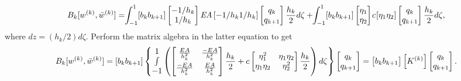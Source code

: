 \documentclass{AeroStructure-ERJohnson}
\begin{document}
\begin{align}\label{eq17.25}
B_{k}[w^{(k)}, \bar{w}^{(k)}]=\hspace*{-3pt}\int_{-1}^{1}\hspace*{-2pt}\left[b_{k} b_{k+1}\right]\left[\begin{array}{@{}c@{}}-1/h_{k} \\1/ h_{k}\end{array}\right] \textit{EA}\left[-1/h_{k} 1/h_{k}\right]\left[\begin{array}{@{}c@{}}q_{k} \\q_{k+1}\end{array}\right] \frac{h_{k}}{2} d \zeta+\hspace*{-3pt}\int_{-1}^{1}\hspace*{-1.5pt}\left[b_{k} b_{k+1}\right]\left[\begin{array}{@{}l@{}}\eta_{1} \\\eta_{2}\end{array}\right] \hspace*{-1pt}c\hspace*{-1pt}\left[\eta_{1} \eta_{2}\right]\left[\begin{array}{@{}c@{}}q_{k} \\q_{k+1}\end{array}\right] \frac{h_{k}}{2} d \zeta,
\end{align}
where $d z=\left(h_{k}/2\right) d \zeta$. Perform the matrix algebra in the latter equation to get
\begin{align}\label{eq17.26}
B_{k}[w^{(k)}, \bar{w}^{(k)}]=\left[b_{k} b_{k+1}\right]\left\{\begin{array}{@{}c@{}}1 \\\int \\-1\end{array}\left(\left[\begin{array}{@{}cc@{}}
\frac{E A}{h_{k}^{2}} & \frac{-E A}{h_{k}^{2}} \\[6pt]
\frac{-E A}{h_{k}^{2}} & \frac{E A}{h_{k}^{2}}
\end{array}\right] \frac{h_{k}}{2}+c\left[\begin{array}{@{}cc@{}}\eta_{1}^{2} & \eta_{1} \eta_{2} \\\eta_{1} \eta_{2} & \eta_{2}^{2}\end{array}\right] \frac{h_{k}}{2}\right) d \zeta\right\}\left[\begin{array}{@{}c@{}}q_{k} \\q_{k+1}\end{array}\right]=\left[\begin{array}{@{}c@{}}b_{k} b_{k+1}\end{array}\right]\left[K^{(k)}\right]\left[\begin{array}{@{}c@{}}q_{k} \\q_{k+1}\end{array}\right].
\end{align}
\end{document}
